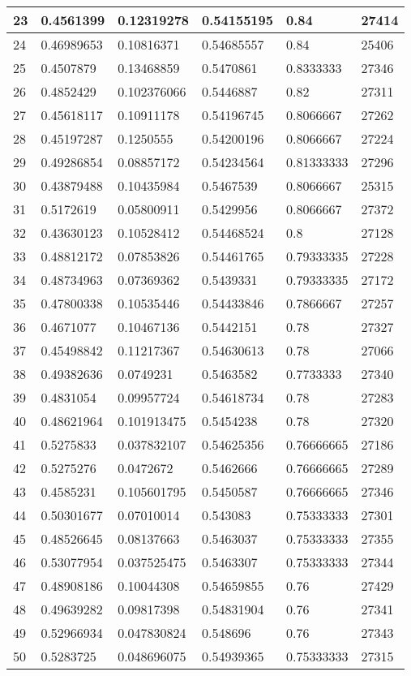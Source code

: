 \begin{longtable}{|l|l|l|l|l|l|}
23 & 0.4561399 & 0.12319278 & 0.54155195 & 0.84 & 27414 \\ \hline 
24 & 0.46989653 & 0.10816371 & 0.54685557 & 0.84 & 25406 \\ \hline 
25 & 0.4507879 & 0.13468859 & 0.5470861 & 0.8333333 & 27346 \\ \hline 
26 & 0.4852429 & 0.102376066 & 0.5446887 & 0.82 & 27311 \\ \hline 
27 & 0.45618117 & 0.10911178 & 0.54196745 & 0.8066667 & 27262 \\ \hline 
28 & 0.45197287 & 0.1250555 & 0.54200196 & 0.8066667 & 27224 \\ \hline 
29 & 0.49286854 & 0.08857172 & 0.54234564 & 0.81333333 & 27296 \\ \hline 
30 & 0.43879488 & 0.10435984 & 0.5467539 & 0.8066667 & 25315 \\ \hline 
31 & 0.5172619 & 0.05800911 & 0.5429956 & 0.8066667 & 27372 \\ \hline 
32 & 0.43630123 & 0.10528412 & 0.54468524 & 0.8 & 27128 \\ \hline 
33 & 0.48812172 & 0.07853826 & 0.54461765 & 0.79333335 & 27228 \\ \hline 
34 & 0.48734963 & 0.07369362 & 0.5439331 & 0.79333335 & 27172 \\ \hline 
35 & 0.47800338 & 0.10535446 & 0.54433846 & 0.7866667 & 27257 \\ \hline 
36 & 0.4671077 & 0.10467136 & 0.5442151 & 0.78 & 27327 \\ \hline 
37 & 0.45498842 & 0.11217367 & 0.54630613 & 0.78 & 27066 \\ \hline 
38 & 0.49382636 & 0.0749231 & 0.5463582 & 0.7733333 & 27340 \\ \hline 
39 & 0.4831054 & 0.09957724 & 0.54618734 & 0.78 & 27283 \\ \hline 
40 & 0.48621964 & 0.101913475 & 0.5454238 & 0.78 & 27320 \\ \hline 
41 & 0.5275833 & 0.037832107 & 0.54625356 & 0.76666665 & 27186 \\ \hline 
42 & 0.5275276 & 0.0472672 & 0.5462666 & 0.76666665 & 27289 \\ \hline 
43 & 0.4585231 & 0.105601795 & 0.5450587 & 0.76666665 & 27346 \\ \hline 
44 & 0.50301677 & 0.07010014 & 0.543083 & 0.75333333 & 27301 \\ \hline 
45 & 0.48526645 & 0.08137663 & 0.5463037 & 0.75333333 & 27355 \\ \hline 
46 & 0.53077954 & 0.037525475 & 0.5463307 & 0.75333333 & 27344 \\ \hline 
47 & 0.48908186 & 0.10044308 & 0.54659855 & 0.76 & 27429 \\ \hline 
48 & 0.49639282 & 0.09817398 & 0.54831904 & 0.76 & 27341 \\ \hline 
49 & 0.52966934 & 0.047830824 & 0.548696 & 0.76 & 27343 \\ \hline 
50 & 0.5283725 & 0.048696075 & 0.54939365 & 0.75333333 & 27315 \\ \hline 
\end{longtable}